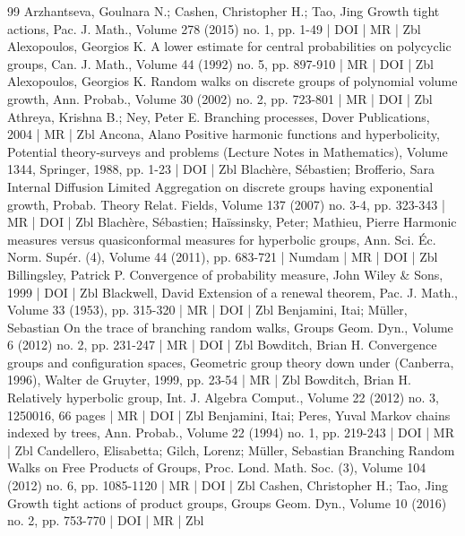 \documentclass[10pt]{amsart}
\theoremstyle{definition}\newtheorem{defi}[theo]{Definition}\newtheorem{rema}[theo]{Remark}\newtheorem{exam}[theo]{Example}\newtheorem{exem}[theo]{Example}\newtheorem{nota}[theo]{Notation}
\begin{document}
\begin{thebibliography}{99}
 Arzhantseva, Goulnara N.; Cashen, Christopher H.; Tao, Jing Growth tight actions, Pac. J. Math., Volume 278 (2015) no. 1, pp. 1-49 | DOI | MR | Zbl
 Alexopoulos, Georgios K. A lower estimate for central probabilities on polycyclic groups, Can. J. Math., Volume 44 (1992) no. 5, pp. 897-910 | MR | DOI | Zbl
 Alexopoulos, Georgios K. Random walks on discrete groups of polynomial volume growth, Ann. Probab., Volume 30 (2002) no. 2, pp. 723-801 | MR | DOI | Zbl
 Athreya, Krishna B.; Ney, Peter E. Branching processes, Dover Publications, 2004 | MR | Zbl
 Ancona, Alano Positive harmonic functions and hyperbolicity, Potential theory-surveys and problems (Lecture Notes in Mathematics), Volume 1344, Springer, 1988, pp. 1-23 | DOI | Zbl
 Blachère, Sébastien; Brofferio, Sara Internal Diffusion Limited Aggregation on discrete groups having exponential growth, Probab. Theory Relat. Fields, Volume 137 (2007) no. 3-4, pp. 323-343 | MR | DOI | Zbl
 Blachère, Sébastien; Haïssinsky, Peter; Mathieu, Pierre Harmonic measures versus quasiconformal measures for hyperbolic groups, Ann. Sci. Éc. Norm. Supér. (4), Volume 44 (2011), pp. 683-721 | Numdam | MR | DOI | Zbl
 Billingsley, Patrick P. Convergence of probability measure, John Wiley \& Sons, 1999 | DOI | Zbl
 Blackwell, David Extension of a renewal theorem, Pac. J. Math., Volume 33 (1953), pp. 315-320 | MR | DOI | Zbl
 Benjamini, Itai; Müller, Sebastian On the trace of branching random walks, Groups Geom. Dyn., Volume 6 (2012) no. 2, pp. 231-247 | MR | DOI | Zbl
 Bowditch, Brian H. Convergence groups and configuration spaces, Geometric group theory down under (Canberra, 1996), Walter de Gruyter, 1999, pp. 23-54 | MR | Zbl
 Bowditch, Brian H. Relatively hyperbolic group, Int. J. Algebra Comput., Volume 22 (2012) no. 3, 1250016, 66 pages | MR | DOI | Zbl
 Benjamini, Itai; Peres, Yuval Markov chains indexed by trees, Ann. Probab., Volume 22 (1994) no. 1, pp. 219-243 | DOI | MR | Zbl
 Candellero, Elisabetta; Gilch, Lorenz; Müller, Sebastian Branching Random Walks on Free Products of Groups, Proc. Lond. Math. Soc. (3), Volume 104 (2012) no. 6, pp. 1085-1120 | MR | DOI | Zbl
 Cashen, Christopher H.; Tao, Jing Growth tight actions of product groups, Groups Geom. Dyn., Volume 10 (2016) no. 2, pp. 753-770 | DOI | MR | Zbl

\end{thebibliography}
\end{document}
